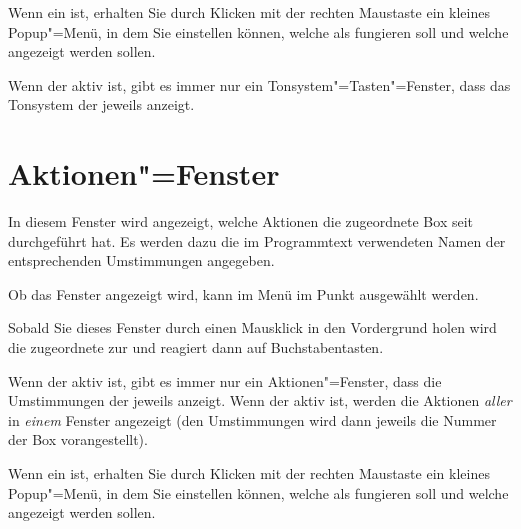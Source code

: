 Wenn ein 
 ist, erhalten Sie durch Klicken
mit der rechten Maustaste ein kleines Popup"=Menü, in dem Sie
einstellen können, welche  als
 fungieren soll und welche
 angezeigt werden sollen.


Wenn der  aktiv ist, gibt es
immer nur ein Tonsystem"=Tasten"=Fenster, dass das Tonsystem der
jeweils  anzeigt.





\section{Aktionen"=Fenster}\label{sec:DE_ACTION}
In diesem Fenster wird angezeigt, welche Aktionen die zugeordnete 
Box seit  durchgeführt 
hat. Es werden dazu die im Programmtext verwendeten Namen der 
entsprechenden Umstimmungen angegeben.


Ob das Fenster angezeigt wird, kann im Menü  
im Punkt  ausgewählt werden.


Sobald Sie dieses Fenster durch einen Mausklick in den Vordergrund
holen wird die zugeordnete  zur
 und reagiert dann auf
Buchstabentasten.


Wenn der  aktiv ist, gibt es
immer nur ein Aktionen"=Fenster, dass die Umstimmungen der jeweils
 anzeigt. Wenn der
 aktiv ist,
werden die Aktionen \emph{aller}
 in \emph{einem} Fenster
angezeigt (den Umstimmungen wird dann jeweils die Nummer der Box
vorangestellt).


Wenn ein 
 ist, erhalten Sie durch Klicken
mit der rechten Maustaste ein kleines Popup"=Menü, in dem Sie
einstellen können, welche  als
 fungieren soll und welche
 angezeigt werden sollen.




